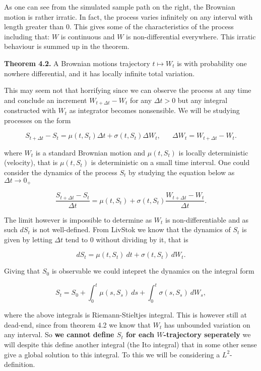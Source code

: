 \documentclass[
]{article}
\begin{document}
As one can see from the simulated sample path on the right, the Brownian
motion is rather irratic. In fact, the process varies infinitely on any
interval with length greater than 0. This gives some of the
characteristics of the process including that: \(W\) is continuous and
\(W\) is non-differential everywhere. This irratic behaviour is summed
up in the theorem.

\textbf{Theorem 4.2.} A Brownian motions trajectory \(t\mapsto W_t\) is
with probability one nowhere differential, and it has locally infinite
total variation.

This may seem not that horrifying since we can observe the process at
any time and conclude an increment \(W_{t+\Delta t}-W_t\) for any
\(\Delta t>0\) but any integral constructed with \(W_t\) as integrator
becomes nonsensible. We will be studying processes on the form

\[S_{t+\Delta t}-S_t=\mu(t,S_t)\Delta t+\sigma(t,S_t)\Delta W_t,\hspace{20pt}\Delta W_t=W_{t+\Delta t}-W_t.\]

where \(W_t\) is a standard Brownian motion and \(\mu(t,S_t)\) is
locally deterministic (velocity), that is \(\mu(t,S_t)\) is
deterministic on a small time interval. One could consider the dynamics
of the process \(S_t\) by studying the equation below as
\(\Delta t\to 0_+\)

\[\frac{S_{t+\Delta t}-S_t}{\Delta t}=\mu(t,S_t)+\sigma(t,S_t)\frac{W_{t+\Delta t}-W_t}{\Delta t}.\]

The limit however is impossible to determine as \(W_t\) is
non-differentiable and as such \(dS_t\) is not well-defined. From
LivStok we know that the dynamics of \(S_t\) is given by letting
\(\Delta t\) tend to 0 without dividing by it, that is

\[
dS_t=\mu(t,S_t)\ dt+\sigma(t,S_t)\ dW_t.
\]

Giving that \(S_0\) is observable we could intepret the dynamics on the
integral form

\[
S_t=S_0+\int_0^t\mu(s,S_s)\ ds+\int_0^t\sigma(s,S_s)\ dW_s,
\]

where the above integrals is Riemann-Stieltjes integral. This is however
still at dead-end, since from theorem 4.2 we know that \(W_t\) has
unbounded variation on any interval. So \textbf{we cannot define \(S_t\)
for each \(W\)-trajectory seperately} we will despite this define
another integral (the Ito integral) that in some other sense give a
global solution to this integral. To this we will be considering a
\(L^2\)-definition.
\end{document}
